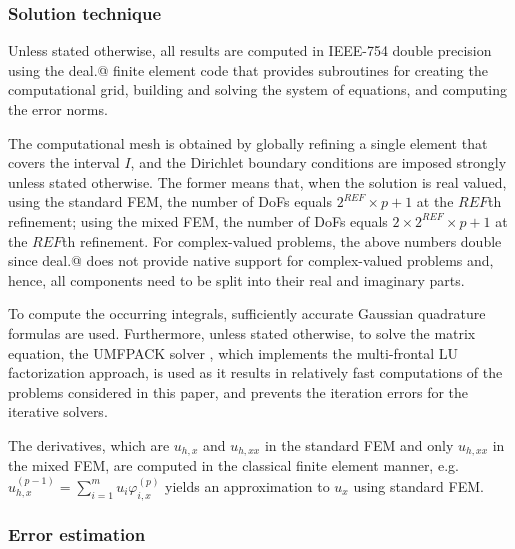 \documentclass[review,3p]{elsarticle}
\makeatletter
\newcommand*{\rom}[1]{\expandafter\@slowromancap\romannumeral #1@}
\makeatother
\begin{document}
\subsubsection{Solution technique}

Unless stated otherwise, all results are computed in IEEE-754 double precision \cite{zuras2008ieee} using the deal.\rom{2} finite element code \cite{alzetta2018deal} that provides subroutines for creating the computational grid, building and solving the system of equations, and computing the error norms.

The computational mesh is obtained by globally refining a single element that covers the interval $I$, and the Dirichlet boundary conditions are imposed strongly unless stated otherwise.
The former means that, when the solution is real valued, using the standard FEM, the number of DoFs equals $2^{REF} \times p+1$ at the $REF$th refinement;
using the mixed FEM, the number of DoFs equals $2 \times 2^{REF} \times p+1$ at the $REF$th refinement.
For complex-valued problems, the above numbers double since deal.\rom{2} does not provide native support for complex-valued problems and, hence, all components need to be split into their real and imaginary parts.

To compute the occurring integrals, sufficiently accurate Gaussian quadrature formulas are used. 
Furthermore, unless stated otherwise, to solve the matrix equation, the UMFPACK solver \cite{davis2004algorithm}, which implements the multi-frontal LU factorization approach, is used as it results in relatively fast computations of the problems considered in this paper, and prevents the iteration errors for the iterative solvers. 

The derivatives, which are $u_{h,x}$ and $u_{h,xx}$ in the standard FEM and only $u_{h,xx}$ in the mixed FEM, are computed in the classical finite element manner, e.g. $u_{h,x} ^{(p-1)}=\sum\limits _{i=1}^m u_i\varphi_{i,x}^{(p)}$ yields an approximation to $u_x$ using standard FEM. 


\subsubsection{Error estimation}
\end{document}
